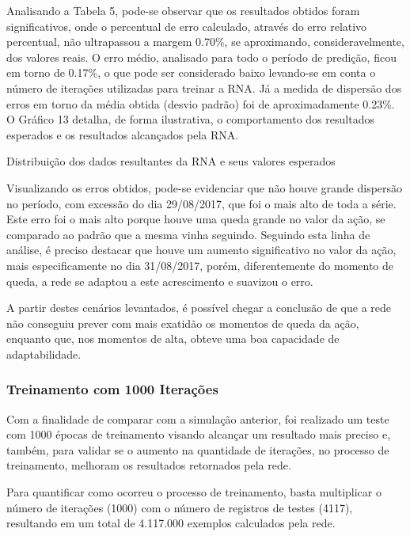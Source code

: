 Analisando a Tabela 5, pode-se observar que os resultados obtidos foram significativos, onde o percentual de erro calculado, através do erro relativo percentual, não ultrapassou a margem 0.70\%, se aproximando, consideravelmente, dos valores reais. O erro médio, analisado para todo o período de predição, ficou em torno de 0.17\%, o que pode ser considerado baixo levando-se em conta o número de iterações utilizadas para treinar a RNA. Já a medida de dispersão dos erros em torno da média obtida (desvio padrão) foi de aproximadamente 0.23\%. O Gráfico 13 detalha, de forma ilustrativa, o comportamento dos resultados esperados e os resultados alcançados pela RNA.
\begin{grafico}[h]
	\centering
	\caption{Distribuição dos dados resultantes da RNA e seus valores esperados}
	\label{lingua}
\end{grafico}

Visualizando os erros obtidos, pode-se evidenciar que não houve grande dispersão no período, com excessão do dia 29/08/2017, que foi o mais alto de toda a série. Este erro foi o mais alto porque houve uma queda grande no valor da ação, se comparado ao padrão que a mesma vinha seguindo. Seguindo esta linha de análise, é preciso destacar que houve um aumento significativo no valor da ação, mais especificamente no dia 31/08/2017, porém, diferentemente do momento de queda, a rede se adaptou a este acrescimento e suavizou o erro. 

A partir destes cenários levantados, é possível chegar a conclusão de que a rede não conseguiu prever com mais exatidão os momentos de queda da ação, enquanto que, nos momentos de alta, obteve uma boa capacidade de adaptabilidade.

\subsubsection{Treinamento com 1000 Iterações}	
Com a finalidade de comparar com a simulação anterior, foi realizado um teste com 1000 épocas de treinamento visando alcançar um resultado mais preciso e, também, para validar se o aumento na quantidade de iterações, no processo de treinamento, melhoram os resultados retornados pela rede.

Para quantificar como ocorreu o processo de treinamento, basta multiplicar o número de iterações (1000) com o número de registros de testes (4117), resultando em um total de 4.117.000 exemplos calculados pela rede.

